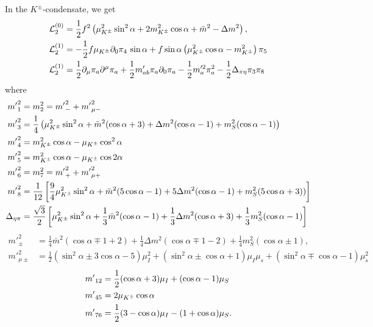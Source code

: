In the $K^\pm$-condensate, we get
%
\begin{align}
    \mathcal{L}^{(0)}_2 
    & =
    \frac{1}{2}f^2 
    \left(
        \mu_{K^\pm}^2 \sin^2\alpha
        + 2m^2_{K^\pm} \cos\alpha
        + \bar m^2 - \Delta m^2
    \right), \\
    \mathcal{L}_2^{(1)}
    & 
    =
    - \frac{1}{2}f\mu_{K^\pm}\partial_0\pi_4 \, \sin\alpha 
    + f\sin\alpha
    \left(
        \mu_{K^\pm}^2 \cos\alpha
        -m_{K^\pm}^2
    \right)\pi_5\\
    \mathcal{L}_2^{(1)}
    & =
    \frac{1}{2} \partial_\mu \pi_a \partial^\mu \pi_a
    + \frac{1}{2}m'_{ab} \pi_a\partial_0\pi_a
    - \frac{1}{2}m'^2_{a} \pi_a^2
    - \frac{1}{2}\Delta_{\pi\eta} \pi_3\pi_8
\end{align}
%
where
%
\begin{align}
    {m'}_1^2 & = m_2^2 = {m'}_-^2 + {m'}_{\mu-}^2\\
    {m'}_3^2 
    & = 
    \frac{1}{4}
    \left(
        \mu_{K^\pm}^2 \sin^2\alpha
        + \bar m^2(\cos\alpha + 3)
        + \Delta m^2 (\cos\alpha -1)
        + m_S^2(\cos\alpha - 1)
    \right)\\
    {m'}_4^2 & = m_{K^\pm}^2\cos\alpha -\mu_{K^\pm} \cos^2\alpha \\
    {m'}_5^2 & = m_{K^\pm}^2\cos\alpha -\mu_{K^\pm} \cos 2\alpha \\
    {m'}_6^2 & = m_7^2 = {m'}_+^2 + {m'}_{\mu+}^2\\
    {m'}_8^2
    & =
    \frac{1}{12}
    \left[
        \frac{9}{4}\mu_{K^\pm}^2\sin^2\alpha
        + \bar m^2(5\cos\alpha-1) 
        + 5\Delta m^2(\cos\alpha-1)
        + m_S^2(5\cos\alpha+3))
    \right] \\
    \Delta_{\eta\pi}
    & =
    \frac{\sqrt{3}}{2}
    \left[
        \mu_{K^\pm}^2\sin^2\alpha
        + \frac{1}{3}\bar m^2(\cos\alpha - 1)
        + \frac{1}{3}\Delta m^2(\cos\alpha + 3)
        + \frac{1}{3}m^2_S(\cos\alpha - 1)
    \right]
\end{align}
%
\begin{align}
    {m'}_\pm^2
    & =
    \frac{1}{4}\bar m^2 (\cos\alpha \mp 1 + 2)
    + \frac{1}{4} \Delta m^2 (\cos\alpha \mp 1-2)
    +\frac{1}{4} m_S^2 (\cos\alpha \pm 1), \\
    {m'}_{\mu\pm}^2
    & =
    \frac{1}{2}(\sin^2\alpha  \pm 3\cos\alpha - 5)\mu_I^2
    +(\sin^2\alpha\pm\cos\alpha + 1)\mu_I\mu_s
    +(\sin^2\alpha\mp\cos\alpha - 1)\mu_s^2
\end{align}
%
\begin{align}
    {m'}_{12} &= \frac{1}{2}(\cos\alpha + 3)\mu_I + (\cos\alpha - 1)\mu_S \\
    {m'}_{45} &= 2\mu_{K^\pm}\cos\alpha \\
    {m'}_{76} &= \frac{1}{2}(3-\cos\alpha) \mu_I - (1 + \cos\alpha)\mu_S.
\end{align}

